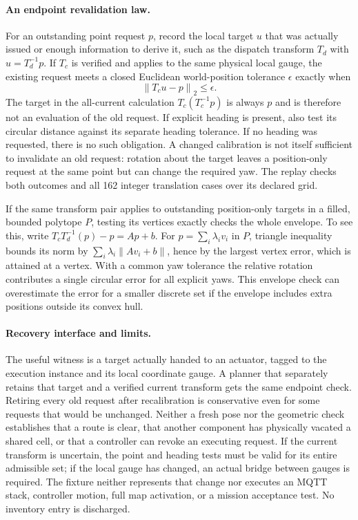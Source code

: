 \documentclass[11pt]{article}
\begin{document}
\paragraph{An endpoint revalidation law.}
For an outstanding point request $p$, record the local target $u$ that
was actually issued or enough information to derive it, such as the
dispatch transform $T_d$ with $u=T_d^{-1}p$. If $T_c$ is verified and
applies to the same physical local gauge, the existing request meets a
closed Euclidean world-position tolerance $\epsilon$ exactly when
\[
  \left\|T_c u-p\right\|_2\leq\epsilon.
\]
The target in the all-current calculation $T_c(T_c^{-1}p)$ is always
$p$ and is therefore not an evaluation of the old request. If explicit
heading is present, also test its circular distance against its
separate heading tolerance. If no heading was requested, there is no
such obligation. A changed calibration is not itself sufficient to
invalidate an old request: rotation about the target leaves a
position-only request at the same point but can change the required yaw.
The replay checks both outcomes and all 162 integer translation cases
over its declared grid.

If the same transform pair applies to outstanding position-only targets
in a filled, bounded polytope $P$, testing its vertices exactly checks
the whole envelope. To see this, write $T_cT_d^{-1}(p)-p=Ap+b$.
For $p=\sum_i\lambda_i v_i$ in $P$, triangle inequality bounds its
norm by $\sum_i\lambda_i\|Av_i+b\|$, hence by the largest vertex
error, which is attained at a vertex. With a common yaw tolerance the
relative rotation contributes a single circular error for all explicit
yaws. This envelope check can overestimate the error for a smaller discrete set if
the envelope includes extra positions outside its convex hull.

\paragraph{Recovery interface and limits.}
The useful witness is a target actually handed to an actuator, tagged to
the execution instance and its local coordinate gauge. A planner that
separately retains that target and a verified current transform gets the
same endpoint check. Retiring every old request after recalibration
is conservative even for some requests that would be unchanged. Neither
a fresh pose nor the geometric check establishes that a route is clear,
that another component has physically vacated a shared cell, or that
a controller can revoke an executing request. If the current transform
is uncertain, the point and heading tests must be valid for its entire
admissible set; if the local gauge has changed, an actual bridge between
gauges is required. The fixture neither represents that change nor
executes an MQTT stack, controller motion, full map activation, or a
mission acceptance test. No inventory entry is discharged.
\end{document}
